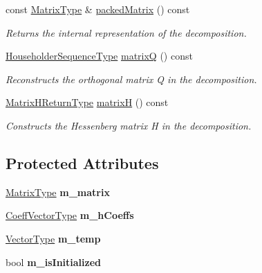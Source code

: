 \begin{DoxyCompactItemize}
const \mbox{\hyperlink{class_eigen_1_1_hessenberg_decomposition_a93a611350a7db9d1da18f2c828ecea9f}{Matrix\+Type}} \& \mbox{\hyperlink{class_eigen_1_1_hessenberg_decomposition_a1f72b7612fd4edc5a6f31005e433e1dd}{packed\+Matrix}} () const
\begin{DoxyCompactList}\small\item\em Returns the internal representation of the decomposition. \end{DoxyCompactList}\item 
\mbox{\hyperlink{class_eigen_1_1_hessenberg_decomposition_a7c1188cd5d8f550c8941df75a50a7d08}{Householder\+Sequence\+Type}} \mbox{\hyperlink{class_eigen_1_1_hessenberg_decomposition_a346441e4902a58d43d698ac3da6ff791}{matrixQ}} () const
\begin{DoxyCompactList}\small\item\em Reconstructs the orthogonal matrix Q in the decomposition. \end{DoxyCompactList}\item 
\mbox{\hyperlink{struct_eigen_1_1internal_1_1_hessenberg_decomposition_matrix_h_return_type}{Matrix\+H\+Return\+Type}} \mbox{\hyperlink{class_eigen_1_1_hessenberg_decomposition_a8e781d2e22a2304647bcf0ae913cc8ea}{matrixH}} () const
\begin{DoxyCompactList}\small\item\em Constructs the Hessenberg matrix H in the decomposition. \end{DoxyCompactList}\end{DoxyCompactItemize}
\subsection*{Protected Attributes}
\begin{DoxyCompactItemize}
\item 
\mbox{\label{class_eigen_1_1_hessenberg_decomposition_aa37e9ef28812c38b5d2a99ebdd67277f}} 
\mbox{\hyperlink{class_eigen_1_1_hessenberg_decomposition_a93a611350a7db9d1da18f2c828ecea9f}{Matrix\+Type}} {\bfseries m\+\_\+matrix}
\item 
\mbox{\label{class_eigen_1_1_hessenberg_decomposition_a65281ce248fefb2c6cf4ebb0eba5289c}} 
\mbox{\hyperlink{class_eigen_1_1_hessenberg_decomposition_a567f99f3770365777b67bf9832b6fac1}{Coeff\+Vector\+Type}} {\bfseries m\+\_\+h\+Coeffs}
\item 
\mbox{\label{class_eigen_1_1_hessenberg_decomposition_a5b3d07e71cfdd559089eb8fb3d17394d}} 
\mbox{\hyperlink{class_eigen_1_1_matrix}{Vector\+Type}} {\bfseries m\+\_\+temp}
\item 
\mbox{\label{class_eigen_1_1_hessenberg_decomposition_a44ab95fd14edfdb937776d841e24af7b}} 
bool {\bfseries m\+\_\+is\+Initialized}
\end{DoxyCompactItemize}


